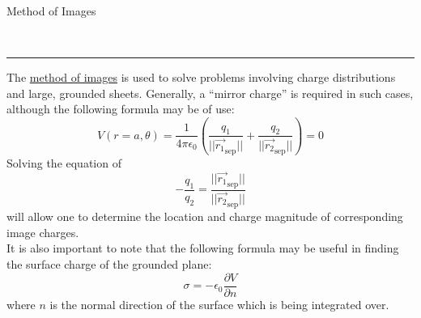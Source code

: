 \documentclass{article}
\newcommand{\header}[1]{\begin{large}\noindent #1\end{large}\\\rule{\textwidth}{0.5pt}}
\newcommand{\gap}{\medskip\\}
\begin{document}
\pagebreak

\header{Method of Images}
The \underline{method of images} is used to solve problems involving charge distributions
and large, grounded sheets. Generally, a ``mirror charge'' is required in such cases, 
although the following formula may be of use:
\[
    V(r = a, \theta) = \frac{1}{4\pi \epsilon_0} \left(\frac{q_1}{||\vec{r_1}_\textrm{sep}||} + \frac{q_2}{||\vec{r_2}_\textrm{sep}||}\right) = 0
\]
Solving the equation of
\[
    -\frac{q_1}{q_2} = \frac{||\vec{r_1}_\textrm{sep}||}{||\vec{r_2}_\textrm{sep}||}
\]
will allow one to determine the location and charge magnitude of corresponding image charges.
\gap
It is also important to note that the following formula may be useful in finding the 
surface charge of the grounded plane:
\[
    \sigma = - \epsilon_0 \frac{\partial V}{\partial n}
\]
where $n$ is the normal direction of the surface which is being integrated over.
\end{document}
